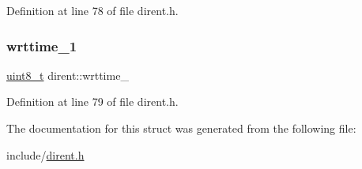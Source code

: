 Definition at line 78 of file dirent.\+h.

\mbox{\label{structdirent_a575f295b267e5ceea0f5356f807dd296}} 
\subsubsection{\texorpdfstring{wrttime\_1}{wrttime\_1}}
{\footnotesize\ttfamily \mbox{\hyperlink{stdint_8h_aba7bc1797add20fe3efdf37ced1182c5}{uint8\+\_\+t}} dirent\+::wrttime\+\_}



Definition at line 79 of file dirent.\+h.



The documentation for this struct was generated from the following file\+:\begin{DoxyCompactItemize}
\item 
include/\mbox{\hyperlink{dirent_8h}{dirent.\+h}}\end{DoxyCompactItemize}
